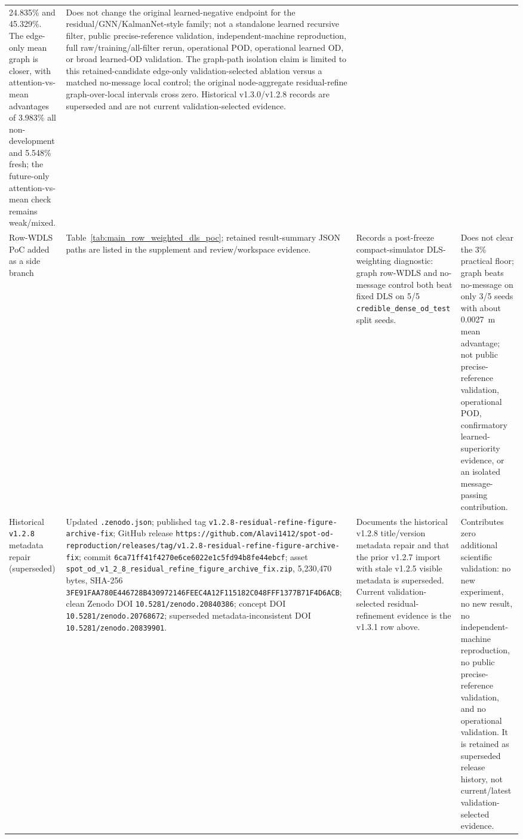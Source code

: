 \begin{table}[t]
{\begin{tabular}{p{3.1cm} p{4.6cm} p{4.0cm} p{5.3cm}}
24.835\% and 45.329\%. The edge-only mean graph is closer, with attention-vs-mean advantages of 3.983\% all non-development and 5.548\% fresh; the future-only attention-vs-mean check remains weak/mixed. & Does not change the original learned-negative endpoint for the residual/GNN/KalmanNet-style family; not a standalone learned recursive filter, public precise-reference validation, independent-machine reproduction, full raw/training/all-filter rerun, operational POD, operational learned OD, or broad learned-OD validation. The graph-path isolation claim is limited to this retained-candidate edge-only validation-selected ablation versus a matched no-message local control; the original node-aggregate residual-refine graph-over-local intervals cross zero. Historical v1.3.0/v1.2.8 records are superseded and are not current validation-selected evidence. \\
\addlinespace
Row-WDLS PoC added as a side branch & Table~\ref{tab:main_row_weighted_dls_poc}; retained result-summary JSON paths are listed in the supplement and review/workspace evidence. & Records a post-freeze compact-simulator DLS-weighting diagnostic: graph row-WDLS and no-message control both beat fixed DLS on 5/5 \texttt{credible\_dense\_od\_test} split seeds. & Does not clear the 3\% practical floor; graph beats no-message on only 3/5 seeds with about 0.0027~m mean advantage; not public precise-reference validation, operational POD, confirmatory learned-superiority evidence, or an isolated message-passing contribution. \\
\addlinespace
Historical \texttt{v1.2.8} metadata repair (superseded) & Updated \texttt{.zenodo.json}; published tag \nolinkurl{v1.2.8-residual-refine-figure-archive-fix}; GitHub release \nolinkurl{https://github.com/Alavi1412/spot-od-reproduction/releases/tag/v1.2.8-residual-refine-figure-archive-fix}; commit \nolinkurl{6ca71ff41f4270e6ce6022e1c5fd94b8fe44ebcf}; asset \nolinkurl{spot_od_v1_2_8_residual_refine_figure_archive_fix.zip}, 5,230,470 bytes, SHA-256 \nolinkurl{3FE91FAA780E446728B430972146FEEC4A12F115182C048FFF1377B71F4D6ACB}; clean Zenodo DOI \nolinkurl{10.5281/zenodo.20840386}; concept DOI \nolinkurl{10.5281/zenodo.20768672}; superseded metadata-inconsistent DOI \nolinkurl{10.5281/zenodo.20839901}. & Documents the historical v1.2.8 title/version metadata repair and that the prior v1.2.7 import with stale v1.2.5 visible metadata is superseded. Current validation-selected residual-refinement evidence is the v1.3.1 row above. & Contributes zero additional scientific validation: no new experiment, no new result, no independent-machine reproduction, no public precise-reference validation, and no operational validation. It is retained as superseded release history, not current/latest validation-selected evidence. \\

\end{tabular}}
\end{table}
